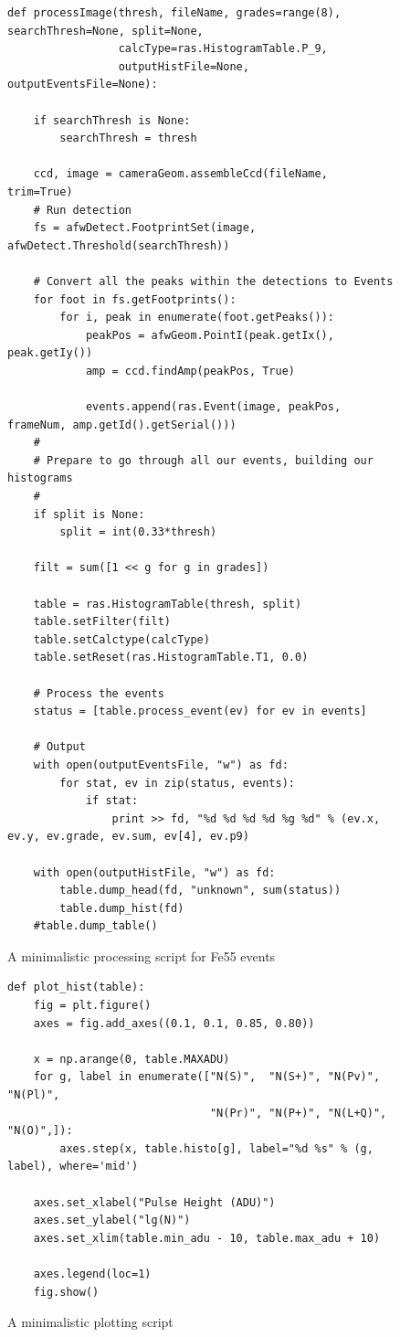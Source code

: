 \documentclass[12pt]{article}
\begin{document}
\begin{figure}
\begin{lstlisting}
def processImage(thresh, fileName, grades=range(8), searchThresh=None, split=None,
                 calcType=ras.HistogramTable.P_9,
                 outputHistFile=None, outputEventsFile=None):

    if searchThresh is None:
        searchThresh = thresh

    ccd, image = cameraGeom.assembleCcd(fileName, trim=True)
    # Run detection
    fs = afwDetect.FootprintSet(image, afwDetect.Threshold(searchThresh))

    # Convert all the peaks within the detections to Events
    for foot in fs.getFootprints():
        for i, peak in enumerate(foot.getPeaks()):
            peakPos = afwGeom.PointI(peak.getIx(), peak.getIy())
            amp = ccd.findAmp(peakPos, True)
                
            events.append(ras.Event(image, peakPos, frameNum, amp.getId().getSerial()))
    #
    # Prepare to go through all our events, building our histograms
    #
    if split is None:
        split = int(0.33*thresh)

    filt = sum([1 << g for g in grades])

    table = ras.HistogramTable(thresh, split)
    table.setFilter(filt)
    table.setCalctype(calcType)
    table.setReset(ras.HistogramTable.T1, 0.0)

    # Process the events
    status = [table.process_event(ev) for ev in events]

    # Output
    with open(outputEventsFile, "w") as fd:
        for stat, ev in zip(status, events):
            if stat:
                print >> fd, "%d %d %d %d %g %d" % (ev.x, ev.y, ev.grade, ev.sum, ev[4], ev.p9)

    with open(outputHistFile, "w") as fd:
        table.dump_head(fd, "unknown", sum(status))
        table.dump_hist(fd)
    #table.dump_table()
\end{lstlisting}
\caption{A minimalistic processing script for Fe55 events}
\label{processImage}
\end{figure}

\begin{figure}
\lstset{language=Python}
\begin{lstlisting}
def plot_hist(table):
    fig = plt.figure()
    axes = fig.add_axes((0.1, 0.1, 0.85, 0.80))

    x = np.arange(0, table.MAXADU)
    for g, label in enumerate(["N(S)",  "N(S+)", "N(Pv)",  "N(Pl)",
                               "N(Pr)", "N(P+)", "N(L+Q)", "N(O)",]):
        axes.step(x, table.histo[g], label="%d %s" % (g, label), where='mid')

    axes.set_xlabel("Pulse Height (ADU)")
    axes.set_ylabel("lg(N)")
    axes.set_xlim(table.min_adu - 10, table.max_adu + 10)

    axes.legend(loc=1)
    fig.show()
\end{lstlisting}
\caption{A minimalistic plotting script}
\label{plot_hist}
\end{figure}
\end{document}
